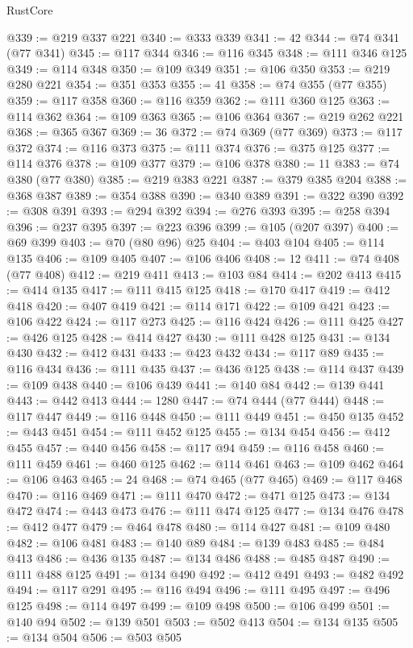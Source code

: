 \begin{lexlean}{RustCore}
\begin{coremodule}
@339 := @219 @337 @221
@340 := @333 @339
@341 := 42
@344 := @74 @341 (@77 @341)
@345 := @117 @344
@346 := @116 @345
@348 := @111 @346 @125
@349 := @114 @348
@350 := @109 @349
@351 := @106 @350
@353 := @219 @280 @221
@354 := @351 @353
@355 := 41
@358 := @74 @355 (@77 @355)
@359 := @117 @358
@360 := @116 @359
@362 := @111 @360 @125
@363 := @114 @362
@364 := @109 @363
@365 := @106 @364
@367 := @219 @262 @221
@368 := @365 @367
@369 := 36
@372 := @74 @369 (@77 @369)
@373 := @117 @372
@374 := @116 @373
@375 := @111 @374
@376 := @375 @125
@377 := @114 @376
@378 := @109 @377
@379 := @106 @378
@380 := 11
@383 := @74 @380 (@77 @380)
@385 := @219 @383 @221
@387 := @379 @385 @204
@388 := @368 @387
@389 := @354 @388
@390 := @340 @389
@391 := @322 @390
@392 := @308 @391
@393 := @294 @392
@394 := @276 @393
@395 := @258 @394
@396 := @237 @395
@397 := @223 @396
@399 := @105 (@207 @397)
@400 := @69 @399
@403 := @70 (@80 @96) @25
@404 := @403 @104
@405 := @114 @135
@406 := @109 @405
@407 := @106 @406
@408 := 12
@411 := @74 @408 (@77 @408)
@412 := @219 @411
@413 := @103 @84
@414 := @202 @413
@415 := @414 @135
@417 := @111 @415 @125
@418 := @170 @417
@419 := @412 @418
@420 := @407 @419
@421 := @114 @171
@422 := @109 @421
@423 := @106 @422
@424 := @117 @273
@425 := @116 @424
@426 := @111 @425
@427 := @426 @125
@428 := @414 @427
@430 := @111 @428 @125
@431 := @134 @430
@432 := @412 @431
@433 := @423 @432
@434 := @117 @89
@435 := @116 @434
@436 := @111 @435
@437 := @436 @125
@438 := @114 @437
@439 := @109 @438
@440 := @106 @439
@441 := @140 @84
@442 := @139 @441
@443 := @442 @413
@444 := 1280
@447 := @74 @444 (@77 @444)
@448 := @117 @447
@449 := @116 @448
@450 := @111 @449
@451 := @450 @135
@452 := @443 @451
@454 := @111 @452 @125
@455 := @134 @454
@456 := @412 @455
@457 := @440 @456
@458 := @117 @94
@459 := @116 @458
@460 := @111 @459
@461 := @460 @125
@462 := @114 @461
@463 := @109 @462
@464 := @106 @463
@465 := 24
@468 := @74 @465 (@77 @465)
@469 := @117 @468
@470 := @116 @469
@471 := @111 @470
@472 := @471 @125
@473 := @134 @472
@474 := @443 @473
@476 := @111 @474 @125
@477 := @134 @476
@478 := @412 @477
@479 := @464 @478
@480 := @114 @427
@481 := @109 @480
@482 := @106 @481
@483 := @140 @89
@484 := @139 @483
@485 := @484 @413
@486 := @436 @135
@487 := @134 @486
@488 := @485 @487
@490 := @111 @488 @125
@491 := @134 @490
@492 := @412 @491
@493 := @482 @492
@494 := @117 @291
@495 := @116 @494
@496 := @111 @495
@497 := @496 @125
@498 := @114 @497
@499 := @109 @498
@500 := @106 @499
@501 := @140 @94
@502 := @139 @501
@503 := @502 @413
@504 := @134 @135
@505 := @134 @504
@506 := @503 @505

\end{coremodule}
\end{lexlean}
